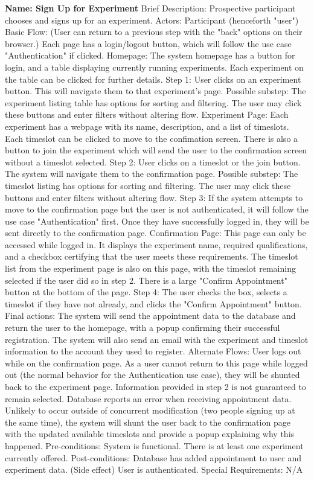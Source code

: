 \begin{outline}[enumerate]
\1 {\bf Name: Sign Up for Experiment}
\2 Brief Description: Prospective participant chooses and signs up for an experiment.
\2 Actors: Participant (henceforth "user")
\2 Basic Flow: (User can return to a previous step with the "back" options on their browser.)  Each page has a login/logout button, which will follow the use case "Authentication" if clicked.
\3 Homepage: The system homepage has a button for login, and a table displaying currently running experiments.  Each experiment on the table can be clicked for further details.
\3 Step 1: User clicks on an experiment button.  This will navigate them to that experiment's page.
\4 Possible substep: The experiment listing table has options for sorting and filtering.  The user may click these buttons and enter filters without altering flow.
\3 Experiment Page: Each experiment has a webpage with its name, description, and a list of timeslots.  Each timeslot can be clicked to move to the confimation screen.  There is also a button to join the experiment which will send the user to the confirmation screen without a timeslot selected.
\3 Step 2: User clicks on a timeslot or the join button.  The system will navigate them to the confirmation page.
\4 Possible substep: The timeslot listing has options for sorting and filtering.  The user may click these buttons and enter filters without altering flow.
\3 Step 3: If the system attempts to move to the confirmation page but the user is not authenticated, it will follow the use case "Authentication" first.  Once they have successfully logged in, they will be sent directly to the confirmation page.
\3 Confirmation Page: This page can only be accessed while logged in.  It displays the experiment name, required qualifications, and a checkbox certifying that the user meets these requirements.  The timeslot list from the experiment page is also on this page, with the timeslot remaining selected if the user did so in step 2.  There is a large "Confirm Appointment" button at the bottom of the page.
\3 Step 4: The user checks the box, selects a timeslot if they have not already, and clicks the "Confirm Appointment" button.
\3 Final actions: The system will send the appointment data to the database and return the user to the homepage, with a popup confirming their successful registration.  The system will also send an email with the experiment and timeslot information to the account they used to register.
\2 Alternate Flows:
\3 User logs out while on the confirmation page.
\4 As a user cannot return to this page while logged out (the normal behavior for the Authentication use case), they will be shunted back to the experiment page.  Information provided in step 2 is not guaranteed to remain selected.
\3 Database reports an error when receiving appointment data.
\4 Unlikely to occur outside of concurrent modification (two people signing up at the same time), the system will shunt the user back to the confirmation page with the updated available timeslots and provide a popup explaining why this happened.
\2 Pre-conditions:
\3 System is functional.
\3 There is at least one experiment currently offered.
\2 Post-conditions:
\3 Database has added appointment to user and experiment data.
\3 (Side effect) User is authenticated.
\2 Special Requirements:
\3 N/A


\end{outline}
